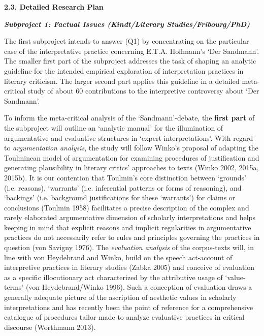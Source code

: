 \vspace{.6cm}
\noindent\textbf{\large 2.3. Detailed Research Plan}




\vspace{.2cm}
\noindent\textbf{\emph{Subproject 1: Factual Issues (Kindt/Literary Studies/Fribourg/PhD)}}
\vspace{.1cm}

\noindent The first subproject intends to answer (Q1) by concentrating on the particular case of the interpretative practice concerning E.T.A. Hoffmann's `Der Sandmann'. The smaller first part of the subproject addresses the task of shaping an analytic guideline for the intended empirical exploration of interpretation practices in literary criticism. The larger second part applies this guideline in a detailed meta-critical study of about 60 contributions to the interpretive controversy about `Der Sandmann'. 

To inform  the meta-critical analysis of the `Sandmann'-debate, the \textbf{first part} of the subproject will outline an `analytic manual' for the illumination of argumentative and evaluative structures in `expert interpretations'. With regard to \emph{argumentation analysis}, the study will follow Winko's proposal of adapting the Toulminean model of argumentation for examining procedures of justification and generating plausibility in literary critics' approaches to texts (Winko 2002, 2015a, 2015b). It is our contention that Toulmin's core distinction between `grounds' (i.e. reasons), `warrants' (i.e. inferential patterns or forms of reasoning), and `backings' (i.e. background justifications for these `warrants') for claims or conclusions (Toulmin 1958) facilitates a precise description of the complex and rarely elaborated argumentative dimension of scholarly interpretations and helps keeping in mind that explicit reasons and implicit regularities in argumentative practices do not necessarily refer to rules and principles governing the practices in question (von Savigny 1976). The \emph{evaluation analysis} of the corpus-texts will, in line with von Heydebrand and Winko, build on the speech act-account of interpretive practices in literary studies (Zabka 2005) and conceive of evaluation as a specific illocutionary act characterized by the attributive usage of `value-terms' (von Heydebrand/Winko 1996). Such a conception of evaluation draws a generally adequate picture of the ascription of aesthetic values in scholarly interpretations and has recently been the point of reference for a comprehensive catalogue of procedures tailor-made to analyze evaluative practices in critical discourse (Worthmann 2013).

